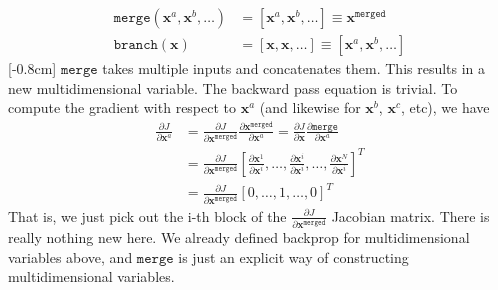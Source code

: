 \begin{align}
    \texttt{merge}(\mathbf{x}^a, \mathbf{x}^b, \ldots) &= [\mathbf{x}^a, \mathbf{x}^b, \ldots] \equiv \mathbf{x}^{\texttt{merged}}\\
    \texttt{branch}(\mathbf{x}) &= [\mathbf{x}, \mathbf{x}, \ldots] \equiv [\mathbf{x}^a, \mathbf{x}^b, \ldots]
\end{align}
[-0.8cm]
$\texttt{merge}$ takes multiple inputs and concatenates them. This results in a new multidimensional variable. The backward pass equation is trivial. To compute the gradient with respect to $\mathbf{x}^{a}$ (and likewise for $\mathbf{x}^b$, $\mathbf{x}^c$, etc), we have
\begin{align}
    \frac{\partial J}{\partial \mathbf{x}^{a}} &= \frac{\partial J}{\partial \mathbf{x}^{\texttt{merged}}} \frac{\partial \mathbf{x}^{\texttt{merged}}}{\partial \mathbf{x}^{a}} = \frac{\partial J}{\partial \mathbf{x}} \frac{\partial \texttt{merge}}{\partial \mathbf{x}^{a}}\\
    &= \frac{\partial J}{\partial \mathbf{x}^{\texttt{merged}}} [\frac{\partial \mathbf{x}^{1}}{\partial \mathbf{x}^{i}}, \ldots, \frac{\partial \mathbf{x}^{i}}{\partial \mathbf{x}^{i}}, \ldots, \frac{\partial \mathbf{x}^{N}}{\partial \mathbf{x}^{i}}]^T\\
    &= \frac{\partial J}{\partial \mathbf{x}^{\texttt{merged}}} [0, \ldots, 1, \ldots, 0]^T
\end{align}
That is, we just pick out the i-th block of the $\frac{\partial J}{\partial \mathbf{x}^{\texttt{merged}}}$ Jacobian matrix. There is really nothing new here. We already defined backprop for multidimensional variables above, and $\texttt{merge}$ is just an explicit way of constructing multidimensional variables.


